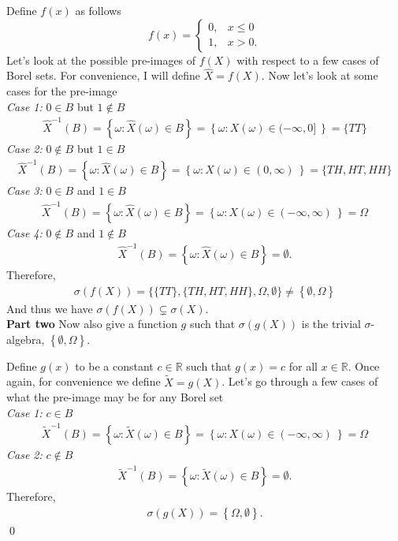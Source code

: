 \documentclass[10pt]{amsart}
\begin{document}
\noindent
Define $f(x)$ as follows
$$
f(x)= \begin{cases}
 	0, & x \leq 0 \\
	1, & x > 0.
\end{cases}
$$
Let's look at the possible pre-images of $f(X)$ with respect to a few cases of Borel sets.
For convenience, I will define $\hat X = f(X)$.
Now let's look at some cases for the pre-image\\
\textit{Case 1:} $0 \in B$ but $1 \not\in B$
\begin{align*}
\hat X^{-1} (B) = \left\{ \omega : \hat X(\omega) \in B \right\} = \left\{ \omega : X(\omega) \in (-\infty, 0] \ \right\} = \{ TT \}
\end{align*}
\textit{Case 2:} $0 \not \in B$ but $1 \in B$
\begin{align*}
\hat X^{-1} (B) = \left\{ \omega : \hat X(\omega) \in B \right\} = \left\{ \omega : X(\omega) \in (0, \infty) \ \right\} = \{ TH, HT, HH \}
\end{align*}
\textit{Case 3:} $0 \in B$ and $1 \in B$
\begin{align*}
\hat X^{-1} (B) = \left\{ \omega : \hat X(\omega) \in B \right\} = \left\{ \omega : X(\omega) \in (-\infty, \infty) \ \right\} = \Omega
\end{align*}
\textit{Case 4:} $0 \not\in B$ and $1 \not\in B$
\begin{align*}
\hat X^{-1} (B) = \left\{ \omega : \hat X(\omega) \in B \right\} = \emptyset.
\end{align*}
Therefore,
\begin{align*}
\sigma(f(X)) = \bigg\{
	\{ TT \},
	\{ TH, HT, HH \},
	\Omega,
	\emptyset
\bigg\} \neq \left\{\emptyset, \Omega \right\}
\end{align*}
And thus we have $\sigma(f(X)) \subsetneq \sigma(X)$. \\
\textbf{Part two}
Now also give a function $g$ such that $\sigma(g(X))$ is the trivial $\sigma$-algebra, $\left\{ \emptyset, \Omega\right\}$.

\noindent
Define $g(x)$ to be a constant $c \in \mathbb R$ such that $g(x) = c$ for all $x \in \mathbb R$.
Once again, for convenience we define $\tilde X = g(X)$.
Let's go through a few cases of what the pre-image may be for any Borel set\\
\textit{Case 1:} $c \in B$
\begin{align*}
\tilde X^{-1} (B) = \left\{ \omega : \tilde X(\omega) \in B \right\} = \left\{ \omega : X(\omega) \in (-\infty, \infty) \ \right\} = \Omega
\end{align*}
\textit{Case 2:} $c \not \in B$
\begin{align*}
\tilde X^{-1} (B) = \left\{ \omega : \tilde X(\omega) \in B \right\} = \emptyset.
\end{align*}
Therefore,
\begin{align*}
\sigma(g(X)) = \left\{ \Omega, \emptyset \right\}.
\end{align*}
\qed
\\
\end{document}
